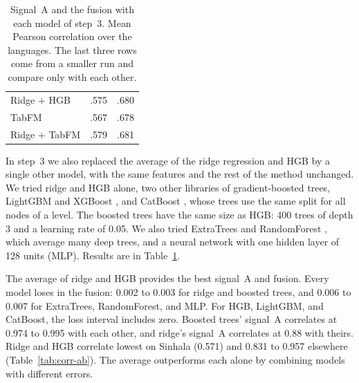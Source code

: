 \documentclass[11pt]{article}
\begin{document}
\begin{table}[hb]
\begin{tabular}{lcc}
Ridge + HGB         & .575 & .680 \\ %
TabFM                & .567 & .678 \\ %
Ridge + TabFM        & .579 & .681 \\ %
\bottomrule
\end{tabular}
\caption{Signal~A and the fusion with each model of step~3. Mean Pearson correlation over the
languages. The last three rows come from a smaller run and compare only with each other.}
\label{tab:signal-a-models}
\end{table}

In step~3 we also replaced the average of the ridge regression and HGB by a single other model, %
with the same features and the rest of the method unchanged. We tried ridge and HGB alone, two
other libraries of gradient-boosted trees, LightGBM \citep{ke-etal-2017-lightgbm} and XGBoost \citep{chen-guestrin-2016-xgboost}, and CatBoost \citep{prokhorenkova-etal-2018-catboost}, whose trees use the
same split for all nodes of a level. The boosted trees have the same size as HGB: 400 trees of %
depth 3 and a learning rate of 0.05. We also tried ExtraTrees \citep{geurts-etal-2006-extremely} and RandomForest \citep{breiman-2001-random}, which average many %
deep trees, and a neural network with one hidden layer of 128 units (MLP). %
Results are in Table~\ref{tab:signal-a-models}.

The average of ridge and HGB provides the best signal~A and fusion. Every model loses in the fusion: %
0.002 to 0.003 for ridge and boosted trees, and 0.006 to 0.007 for ExtraTrees, RandomForest, and
MLP. For HGB, LightGBM, and CatBoost, the loss interval includes zero. Boosted trees' signal~A %
correlates at 0.974 to 0.995 with each other, and ridge's signal~A correlates at 0.88 with theirs. %
Ridge and HGB correlate lowest on Sinhala (0.571) and 0.831 to 0.957 elsewhere
(Table~\ref{tab:corr-ab}). The average outperforms each alone by combining models with different %
errors.
\end{document}
